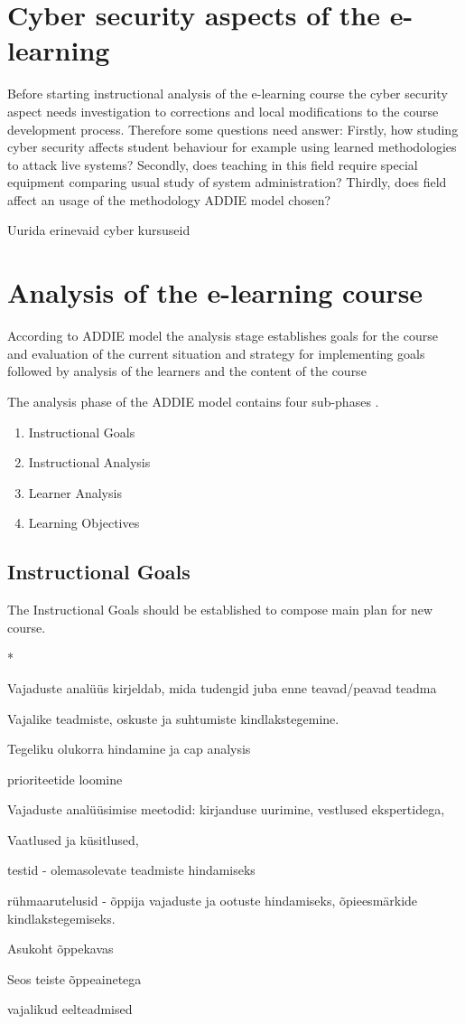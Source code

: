 \section{Cyber security aspects of the e-learning}
Before starting instructional analysis of the e-learning course the cyber security aspect needs investigation to corrections and local modifications to the course development process. Therefore some questions need answer: Firstly, how studing cyber security affects student behaviour for example using learned methodologies to attack live systems? Secondly, does teaching in this field require special equipment comparing usual study of system administration? Thirdly, does field affect an usage of the methodology \gls{ADDIE} model chosen?

{\color{red} Uurida erinevaid cyber kursuseid } 


\section{Analysis of the e-learning course}
According to \gls{ADDIE} model the analysis stage establishes goals for the course and evaluation of the current situation and strategy for implementing goals followed by analysis of the learners and the content of the course \citep{website:addie}

The analysis phase of the \gls{ADDIE} model contains four sub-phases \citep{website:addie}.
\begin{enumerate}
\item Instructional Goals
\item Instructional Analysis
\item Learner Analysis
\item Learning Objectives
\end{enumerate}


\subsection{Instructional Goals}
The Instructional Goals should be established to compose main plan for new course. \citep{website:addie}


{\color{red} *

Vajaduste analüüs kirjeldab, mida tudengid juba enne teavad/peavad teadma

Vajalike teadmiste, oskuste ja suhtumiste kindlakstegemine.

Tegeliku olukorra hindamine ja cap analysis

prioriteetide loomine


Vajaduste analüüsimise meetodid:
kirjanduse uurimine, vestlused ekspertidega,


Vaatlused ja küsitlused,


testid - olemasolevate teadmiste hindamiseks

rühmaarutelusid  - õppija vajaduste ja ootuste hindamiseks, õpieesmärkide kindlakstegemiseks.


Asukoht õppekavas

Seos teiste õppeainetega

vajalikud eelteadmised

}



